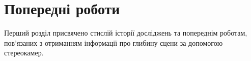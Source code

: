 \chapter{Попередні роботи}

Перший розділ присвячено стислій історії досліджень та попереднім роботам, пов'язаних з отриманням інформації про глибину сцени за допомогою стереокамер.





















